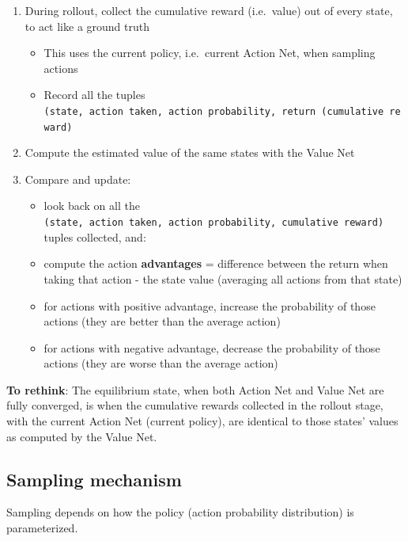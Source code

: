\documentclass[
  letterpaper,
  DIV=11,
  numbers=noendperiod]{scrartcl}
\providecommand{\tightlist}{%
  \setlength{\itemsep}{0pt}\setlength{\parskip}{0pt}}
\begin{document}
\begin{enumerate}
\def\labelenumi{\arabic{enumi}.}
\tightlist
\item
  During rollout, collect the cumulative reward (i.e.~value) out of
  every state, to act like a ground truth

  \begin{itemize}
  \tightlist
  \item
    This uses the current policy, i.e.~current Action Net, when sampling
    actions
  \item
    Record all the tuples
    \texttt{(state,\ action\ taken,\ action\ probability,\ return\ (cumulative\ reward)}
  \end{itemize}
\item
  Compute the estimated value of the same states with the Value Net
\item
  Compare and update:

  \begin{itemize}
  \tightlist
  \item
    look back on all the
    \texttt{(state,\ action\ taken,\ action\ probability,\ cumulative\ reward)}
    tuples collected, and:
  \item
    compute the action \textbf{advantages} = difference between the
    return when taking that action - the state value (averaging all
    actions from that state)
  \item
    for actions with positive advantage, increase the probability of
    those actions (they are better than the average action)
  \item
    for actions with negative advantage, decrease the probability of
    those actions (they are worse than the average action)
  \end{itemize}
\end{enumerate}

\textbf{To rethink}: The equilibrium state, when both Action Net and
Value Net are fully converged, is when the cumulative rewards collected
in the rollout stage, with the current Action Net (current policy), are
identical to those states' values as computed by the Value Net.

\subsection{Sampling mechanism}\label{sampling-mechanism}

Sampling depends on how the policy (action probability distribution) is
parameterized.
\end{document}
